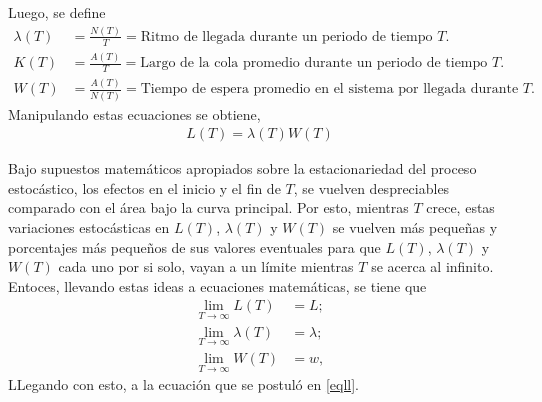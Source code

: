 \begin{itemize}
    Luego, se define
    \begin{align*}
        \lambda(T) &= \frac{N(T)}{T} = \text{Ritmo de llegada durante un periodo de tiempo $T$}.\\
        K(T) &= \frac{A(T)}{T} = \text{Largo de la cola promedio durante un periodo de tiempo $T$}.\\
        W(T) &= \frac{A(T)}{N(T)} = \text{Tiempo de espera promedio en el sistema por llegada durante $T$}.
    \end{align*}
    Manipulando estas ecuaciones se obtiene,
    \begin{align*}
        L(T) = \lambda(T)W(T)
    \end{align*}
    \begin{adjustwidth}{1.27cm}{}
        Bajo supuestos matemáticos apropiados sobre la estacionariedad del proceso estocástico, los efectos en el inicio y el fin de $T$, se vuelven despreciables comparado con el área bajo la curva principal. Por esto, mientras $T$ crece, estas variaciones estocásticas en $L(T)$, $\lambda(T)$ y $W(T)$ se vuelven más pequeñas y porcentajes más pequeños de sus valores eventuales para que $L(T)$, $\lambda(T)$ y $W(T)$ cada uno por si solo, vayan a un límite mientras $T$ se acerca al infinito. Entoces, llevando estas ideas a ecuaciones matemáticas, se tiene que %
        \begin{align*}
            \lim_{T\to\infty}L(T)&=L;\\
            \lim_{T\to\infty}\lambda(T)&=\lambda;\\
            \lim_{T\to\infty}W(T)&=w,
        \end{align*}
        LLegando con esto, a la ecuación que se postuló en \ref{eqll}.
    \end{adjustwidth}
\end{itemize}




